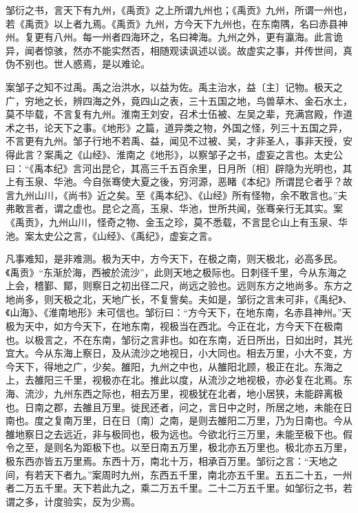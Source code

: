 \documentclass[]{article}
\begin{document}
邹衍之书，言天下有九州，《禹贡》之上所谓九州也；《禹贡》九州，所谓一州也，若《禹贡》以上者九焉。《禹贡》九州，方今天下九州也，在东南隅，名曰赤县神州。复更有八州。每一州者四海环之，名曰裨海。九州之外，更有瀛海。此言诡异，闻者惊骇，然亦不能实然否，相随观读讽述以谈。故虚实之事，并传世间，真伪不别也。世人惑焉，是以难论。

案邹子之知不过禹。禹之治洪水，以益为佐。禹主治水，益〔主〕记物。极天之广，穷地之长，辨四海之外，竟四山之表，三十五国之地，鸟兽草木、金石水土，莫不毕载，不言复有九州。淮南王刘安，召术士伍被、左吴之辈，充满宫殿，作道术之书，论天下之事。《地形》之篇，道异类之物，外国之怪，列三十五国之异，不言更有九州。邹子行地不若禹、益，闻见不过被、吴，才非圣人，事非天授，安得此言？案禹之《山经》、淮南之《地形》，以察邹子之书，虚妄之言也。太史公曰：``《禹本纪》言河出昆仑，其高三千五百余里，日月所〔相〕辟隐为光明也，其上有玉泉、华池。今自张骞使大夏之後，穷河源，恶睹《本纪》所谓昆仑者乎？故言九州山川，《尚书》近之矣。至《禹本纪》、《山经》所有怪物，余不敢言也。''夫弗敢言者，谓之虚也。昆仑之高，玉泉、华池，世所共闻，张骞亲行无其实。案《禹贡》，九州山川，怪奇之物、金玉之珍，莫不悉载，不言昆仑山上有玉泉、华池。案太史公之言，《山经》、《禹纪》，虚妄之言。

凡事难知，是非难测。极为天中，方今天下，在极之南，则天极北，必高多民。《禹贡》``东渐於海，西被於流沙''，此则天地之极际也。日刺径千里，今从东海之上会，稽鄞、鄮，则察日之初出径二尺，尚远之验也。远则东方之地尚多。东方之地尚多，则天极之北，天地广长，不复訾矣。夫如是，邹衍之言未可非，《禹纪》、《山海》、《淮南地形》未可信也。邹衍曰：``方今天下，在地东南，名赤县神州。''天极为天中，如方今天下，在地东南，视极当在西北。今正在北，方今天下在极南也。以极言之，不在东南，邹衍之言非也。如在东南，近日所出，日如出时，其光宜大。今从东海上察日，及从流沙之地视日，小大同也。相去万里，小大不变，方今天下，得地之广，少矣。雒阳，九州之中也，从雒阳北顾，极正在北。东海之上，去雒阳三千里，视极亦在北。推此以度，从流沙之地视极，亦必复在北焉。东海、流沙，九州东西之际也，相去万里，视极犹在北者，地小居狭，未能辟离极也。日南之郡，去雒且万里。徙民还者，问之，言日中之时，所居之地，未能在日南也。度之复南万里，日在日〔南〕之南，是则去雒阳二万里，乃为日南也。今从雒地察日之去远近，非与极同也，极为远也。今欲北行三万里，未能至极下也。假令之至，是则名为距极下也。以至日南五万里，极北亦五万里也。极北亦五万里，极东西亦皆五万里焉。东西十万，南北十万，相承百万里。邹衍之言：``天地之间，有若天下者九。''案周时九州，东西五千里，南北亦五千里。五五二十五，一州者二万五千里。天下若此九之，乘二万五千里。二十二万五千里。如邹衍之书，若谓之多，计度验实，反为少焉。
\end{document}
